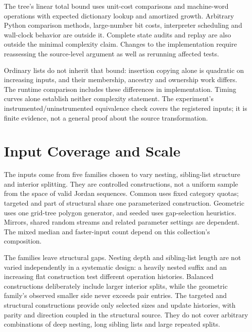 The tree's linear total bound uses unit-cost comparisons and machine-word
operations with expected dictionary lookup and amortized growth. Arbitrary
Python comparison methods, large-number bit costs, interpreter scheduling and
wall-clock behavior are outside it. Complete state audits and replay are also
outside the minimal complexity claim. Changes to the implementation require
reassessing the source-level argument as well as rerunning affected tests.

Ordinary lists do not inherit that bound: insertion copying alone is quadratic
on increasing inputs, and their membership, ancestry and ownership work differs.
The runtime comparison includes these differences in implementation. Timing
curves alone establish neither complexity statement. The experiment's
instrumented/uninstrumented equivalence check covers the \UnifiedN{} registered
inputs; it is finite evidence, not a general proof about the source transformation.

\section{Input Coverage and Scale}
\label{sec:limitations-sizes}
\label{sec:limitations-generality}

The \UnifiedN{} inputs come from five families chosen to vary nesting,
sibling-list structure and interior splitting. They are controlled
constructions, not a uniform sample from the space of valid Jordan sequences.
Common uses fixed category quotas; targeted and part of structural share one
parameterized construction. Geometric uses one grid-tree polygon generator,
and seeded uses gap-selection heuristics. Mirrors, shared random streams and
related parameter settings are dependent. The mixed median and faster-input
count depend on this collection's composition.

The families leave structural gaps. Nesting depth and sibling-list length
are not varied independently in a systematic design: a heavily nested suffix
and an increasing flat construction test different operation histories.
Balanced constructions deliberately include larger interior splits, while the
geometric family's observed smaller side never exceeds
\UnifiedGeometricSmallMax{} pair entries. The targeted and structural
constructions provide only selected sizes and update histories, with parity
and direction coupled in the structural source. They do not cover arbitrary
combinations of deep nesting, long sibling lists and large repeated splits.

